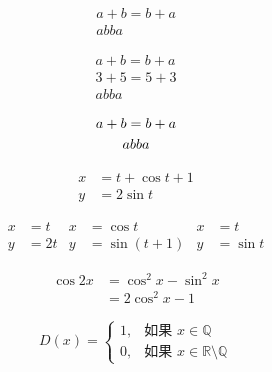 \documentclass{ctexart}
\begin{document}
	\begin{gather}
		a + b = b + a \\
		ab ba
	\end{gather}
	
	\begin{gather*}
	a + b = b + a \\
	3 + 5 = 5 + 3 \\
	ab ba
	\end{gather*}
	
	\begin{gather}
		a + b = b + a \notag \\
		ab ba \notag
	\end{gather}
	
	\begin{align}
		x &= t + \cos t + 1 \\
		y &= 2\sin t
	\end{align}
	
	\begin{align*}
	x &= t & x &= \cos t & x &= t\\
	y &= 2t & y &= \sin (t + 1) & y &= \sin t
	\end{align*}
	
	\begin{equation}
		\begin{split}
			\cos 2x &= \cos ^2 x - \sin ^2 x \\ %
					&= 2\cos ^2 x - 1
		\end{split}
	\end{equation}
	
	\begin{equation}
		D(x) = \begin{cases}
			1, & \text{如果 } x \in \mathbb{Q} \\ %
			0, & \text{如果 } x \in \mathbb{R} \setminus\mathbb{Q}
		\end{cases}
	\end{equation}
	
\end{document}
